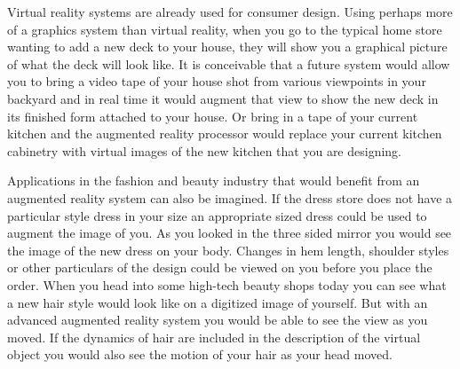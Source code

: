 Virtual reality systems are already used for consumer design. Using perhaps more of a graphics system than virtual reality, when you go to the typical home store wanting to add a new deck to your house, they will show you a graphical picture of what the deck will look like. It is conceivable that a future system would allow you to bring a video tape of your house shot from various viewpoints in your backyard and in real time it would augment that view to show the new deck in its finished form attached to your house. Or bring in a tape of your current kitchen and the augmented reality processor would replace your current kitchen cabinetry with virtual images of the new kitchen that you are designing.

Applications in the fashion and beauty industry that would benefit from an augmented reality system can also be imagined. If the dress store does not have a particular style dress in your size an appropriate sized dress could be used to augment the image of you. As you looked in the three sided mirror you would see the image of the new dress on your body. Changes in hem length, shoulder styles or other particulars of the design could be viewed on you before you place the order. When you head into some high-tech beauty shops today you can see what a new hair style would look like on a digitized image of yourself. But with an advanced augmented reality system you would be able to see the view as you moved. If the dynamics of hair are included in the description of the virtual object you would also see the motion of your hair as your head moved.
